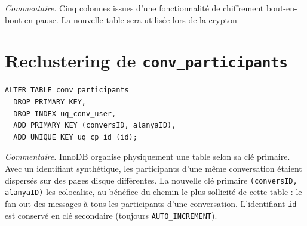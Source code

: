 \documentclass[a4paper,11pt]{article}
\begin{document}
\noindent\textit{Commentaire.} Cinq colonnes issues d'une fonctionnalité de chiffrement bout-en-bout en pause. La nouvelle table sera utilisée lors de la crypton

\section{Reclustering de \texttt{conv\_participants}}

\begin{lstlisting}
ALTER TABLE conv_participants
  DROP PRIMARY KEY,
  DROP INDEX uq_conv_user,
  ADD PRIMARY KEY (conversID, alanyaID),
  ADD UNIQUE KEY uq_cp_id (id);
\end{lstlisting}

\noindent\textit{Commentaire.} InnoDB organise physiquement une table selon sa clé primaire. Avec un identifiant synthétique, les participants d'une même conversation étaient dispersés sur des pages disque différentes. La nouvelle clé primaire \texttt{(conversID, alanyaID)} les colocalise, au bénéfice du chemin le plus sollicité de cette table : le fan-out des messages à tous les participants d'une conversation. L'identifiant \texttt{id} est conservé en clé secondaire (toujours \texttt{AUTO\_INCREMENT}).
\end{document}
